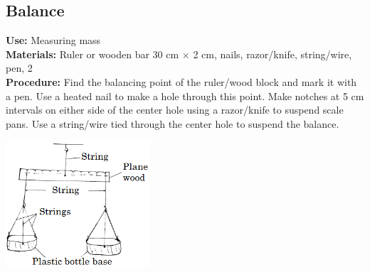 \begin{multicols}{2}


\section{Balance}
\label{sec:balance}
\vspace{-10pt}
\textbf{Use:} Measuring mass\\
\textbf{Materials:} Ruler or wooden bar 30 cm $\times$ 2 cm, nails, razor/knife, string/wire, pen, 2 \\
\textbf{Procedure:} Find the balancing point of the ruler/wood block and mark it with a pen. Use a heated nail to make a hole through this point. Make notches at 5 cm intervals on either side of the center hole using a razor/knife to suspend scale pans. Use a string/wire tied through the center hole to suspend the balance.
\begin{center}
\includegraphics[width=0.4\textwidth]{./img/beam-balance-2.png}
\end{center}


\end{multicols}
